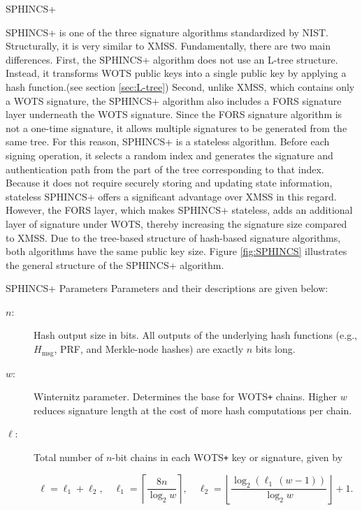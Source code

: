 \begin{section}{SPHINCS+}

    SPHINCS+ \cite{gaithersburgmdnist_2024_stateless} is one of the three signature algorithms standardized by NIST. Structurally, it is very similar to XMSS. Fundamentally, there are two main differences. First, the SPHINCS+ algorithm does not use an L-tree structure. Instead, it transforms WOTS public keys into a single public key by applying a hash function.(see section \ref{sec:L-tree}) Second, unlike XMSS, which contains only a WOTS signature, the SPHINCS+ algorithm also includes a FORS signature layer underneath the WOTS signature. Since the FORS signature algorithm is not a one-time signature, it allows multiple signatures to be generated from the same tree. For this reason, SPHINCS+ is a stateless algorithm. Before each signing operation, it selects a random index and generates the signature and authentication path from the part of the tree corresponding to that index. Because it does not require securely storing and updating state information, stateless SPHINCS+ offers a significant advantage over XMSS in this regard. However, the FORS layer, which makes SPHINCS+ stateless, adds an additional layer of signature under WOTS, thereby increasing the signature size compared to XMSS. Due to the tree-based structure of hash-based signature algorithms, both algorithms have the same public key size. Figure \ref{fig:SPHINCS} illustrates the general structure of the SPHINCS+ algorithm. 
    \begin{subsection}{SPHINCS+ Parameters}
        Parameters and their descriptions are given below: 
    \begin{description}
  \item[$n$:] Hash output size in bits. All outputs of the underlying hash functions (e.g., $H_{\mathrm{msg}}$, PRF, and Merkle-node hashes) are exactly $n$ bits long.
  
  \item[$w$:] Winternitz parameter. Determines the base for WOTS\texttt{+} chains.  
    Higher $w$ reduces signature length at the cost of more hash computations per chain.

  \item[$\ell$:] Total number of $n$-bit chains in each WOTS\texttt{+} key or signature, given by


\[
    \ell = \ell_1 + \ell_2,
    \quad
    \ell_1 = \left\lceil \frac{8n}{\log_2 w} \right\rceil,
    \quad
    \ell_2 = \left\lfloor \frac{\log_2(\ell_1\,(w-1))}{\log_2 w} \right\rfloor + 1.
  \]


\end{description}
\end{subsection}
\end{section}

